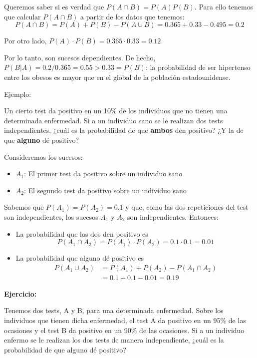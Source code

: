 \documentclass[
  spanish,
  letterpaper,
  DIV=11,
  numbers=noendperiod]{scrreprt}
\providecommand{\tightlist}{%
  \setlength{\itemsep}{0pt}\setlength{\parskip}{0pt}}
\begin{document}
\begin{tcolorbox}
Queremos saber si es verdad que \(P(A\cap B)=P(A)P(B)\). Para ello
tenemos que calcular \(P(A\cap B)\) a partir de los datos que tenemos:
\[
P(A \cap B)  =P(A)+P(B)-P(A\cup B)=0.365+0.33-0.495=0.2
\]

Por otro lado, \(P(A)\cdot P(B)= 0.365\cdot 0.33=0.12\)

Por lo tanto, son sucesos dependientes. De hecho,
\(P(B|A)=0.2/0.365=0.55> 0.33=P(B)\): la probabilidad de ser hipertenso
entre los obesos es mayor que en el global de la población
estadounidense.

Ejemplo:

Un cierto test da positivo en un 10\% de los individuos que no tienen
una determinada enfermedad. Si a un individuo sano se le realizan dos
tests independientes, ¿cuál es la probabilidad de que \textbf{ambos} den
positivo? ¿Y la de que \textbf{alguno} dé positivo?

Consideremos los sucesos:

\begin{itemize}
\tightlist
\item
  \(A_1\): El primer test da positivo sobre un individuo sano
\item
  \(A_2\): El segundo test da positivo sobre un individuo sano
\end{itemize}

Sabemos que \(P(A_1)=P(A_2)=0.1\) y que, como las dos repeticiones del
test son independientes, los sucesos \(A_1\) y \(A_2\) son
independientes. Entonces:

\begin{itemize}
\item
  La probabilidad que los dos den positivo es \[
  P(A_1\cap A_2) =P(A_1)\cdot P(A_2)  =0.1\cdot 0.1=0.01
  \]
\item
  La probabilidad que alguno dé positivo es \[
  \begin{array}{rl}
  P(A_1\cup A_2)\!\!\!\! & =P(A_1)+P(A_2)-P(A_1\cap A_2)\\
  & = 0.1+0.1-0.01=0.19
  \end{array}
  \]
\end{itemize}

\textbf{Ejercicio:}

Tenemos dos tests, A y B, para una determinada enfermedad. Sobre los
individuos que tienen dicha enfermedad, el test A da positivo en un 95\%
de las ocasiones y el test B da positivo en un 90\% de las ocasiones. Si
a un individuo enfermo se le realizan los dos tests de manera
independiente, ¿cuál es la probabilidad de que alguno dé positivo?


\end{tcolorbox}
\end{document}
